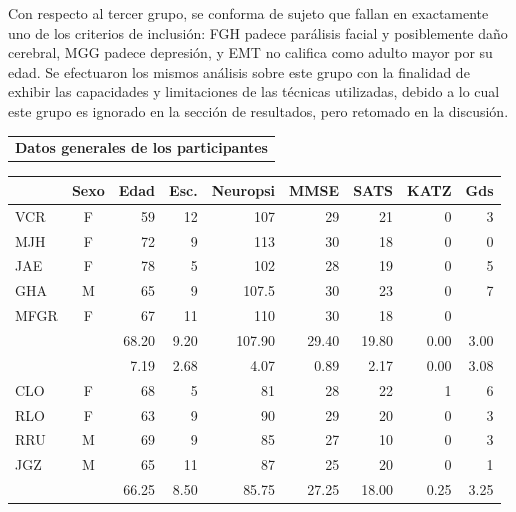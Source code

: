 \documentclass[12pt,a4paper]{mitthesis}
\newcommand{\bordes}[1]{\renewcommand{\arraystretch}{#1}}
\begin{document}
Con respecto al tercer grupo, se conforma de sujeto que
fallan en exactamente uno de los criterios de 
inclusi\'on: FGH padece par\'alisis facial y posiblemente da\~no cerebral, MGG padece depresi\'on, 
y EMT no califica como adulto mayor por su edad.
Se efectuaron los mismos an\'alisis sobre este grupo con la finalidad de exhibir las capacidades y
limitaciones de las t\'ecnicas utilizadas, debido a lo cual este grupo es ignorado en la secci\'on 
de resultados, pero retomado en la discusi\'on.

\begin{table}
\centering
\bordes{1.1}
\begin{tabular}{c}
\textbf{Datos generales de los participantes}
\vspace{1em}
\end{tabular}
\begin{small}
\begin{tabular}{lcrrrrrrr}
\toprule
 & \textbf{Sexo} & \textbf{Edad} & \textbf{Esc.} & \textbf{Neuropsi} & \textbf{MMSE} & \textbf{SATS} & \textbf{KATZ} & \textbf{Gds} \\
\midrule
VCR    & F    & 59   & 12   & 107      & 29   & 21   & 0    & 3 \\
MJH    & F    & 72   & 9    & 113      & 30   & 18   & 0    & 0 \\
JAE    & F    & 78   & 5    & 102      & 28   & 19   & 0    & 5 \\
GHA    & M    & 65   & 9    & 107.5    & 30   & 23   & 0    & 7 \\
MFGR   & F    & 67   & 11   & 110      & 30   & 18   & 0    &   \\
\rowcolor{gris}
\multicolumn{1}{c}{$\widehat{\mu}$} & 
              & 68.20& 9.20 & 107.90   & 29.40& 19.80& 0.00 & 3.00\\
\rowcolor{gris}
\multicolumn{1}{c}{$\widehat{\sigma}$} & 
              & 7.19 & 2.68 & 4.07     & 0.89 & 2.17 & 0.00 & 3.08\\
\hline
CLO    & F    & 68   & 5    & 81       & 28   & 22   & 1    & 6 \\
RLO    & F    & 63   & 9    & 90       & 29   & 20   & 0    & 3 \\
RRU    & M    & 69   & 9    & 85       & 27   & 10   & 0    & 3 \\
JGZ    & M    & 65   & 11   & 87       & 25   & 20   & 0    & 1 \\
\rowcolor{gris}
\multicolumn{1}{c}{$\widehat{\mu}$} & 
              & 66.25& 8.50 & 85.75   & 27.25& 18.00& 0.25 & 3.25\\

\end{tabular}
\end{small}
\end{table}
\end{document}
